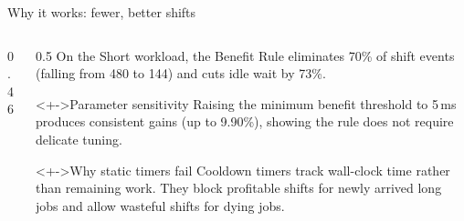 \documentclass[aspectratio=169,11pt,c]{beamer}
\begin{document}
\begin{frame}{Why it works: fewer, better shifts}
  \begin{columns}[T]
    \begin{column}{0.46\textwidth}
      \centering
    \end{column}
    \begin{column}{0.5\textwidth}
      \scriptsize
      On the Short workload, the Benefit Rule eliminates \alert{70\% of shift events} (falling from 480 to 144) and cuts idle wait by \alert{73\%}.
      \begin{block}<+->{Parameter sensitivity}
        Raising the minimum benefit threshold to 5\,ms produces consistent gains (up to 9.90\%), showing the rule does not require delicate tuning.
      \end{block}
      \begin{alertblock}<+->{Why static timers fail}
        Cooldown timers track wall-clock time rather than remaining work. They block profitable shifts for newly arrived long jobs and allow wasteful shifts for dying jobs.
      \end{alertblock}
    \end{column}
  \end{columns}
\end{frame}
\end{document}
